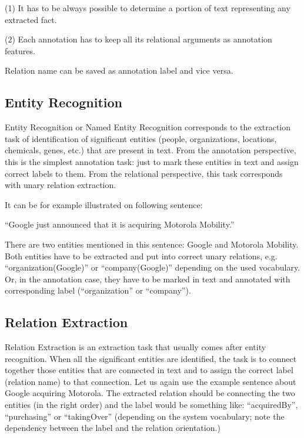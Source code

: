 (1) It has to be always possible to determine a portion of text representing any extracted fact.

(2) Each annotation has to keep all its relational arguments as annotation features.

Relation name can be saved as annotation label and vice versa.

\subsection{Entity Recognition} \label{sec:problems_entity_recognition}

Entity Recognition or Named Entity Recognition corresponds to the extraction task of identification of significant entities (people, organizations, locations, chemicals, genes, etc.) that are present in text. From the annotation perspective, this is the simplest annotation task: just to mark these entities in text and assign correct labels to them. From the relational perspective, this task corresponds with unary relation extraction.

It can be for example illustrated on following sentence:

“Google just announced that it is acquiring Motorola Mobility.”

There are two entities mentioned in this sentence: Google and Motorola Mobility. Both entities have to be extracted and put into correct unary relations, e.g. “organization(Google)” or “company(Google)” depending on the used vocabulary. Or, in the annotation case, they have to be marked in text and annotated with corresponding label (“organization” or “company”).

\subsection{Relation Extraction}

Relation Extraction is an extraction task that usually comes after entity recognition. When all the significant entities are identified, the task is to connect together those entities that are connected in text and to assign the correct label (relation name) to that connection. Let us again use the example sentence about Google acquiring Motorola. The extracted relation should be connecting the two entities (in the right order) and the label would be something like: “acquiredBy”, “purchasing” or “takingOver” (depending on the system vocabulary; note the dependency between the label and the relation orientation.)

